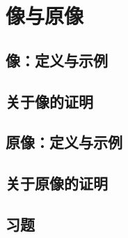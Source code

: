 \section{像与原像}\label{sec:section7.3}

\subsection{像：定义与示例}

\subsection{关于像的证明}

\subsection{原像：定义与示例}

\subsection{关于原像的证明}

\subsection{习题}